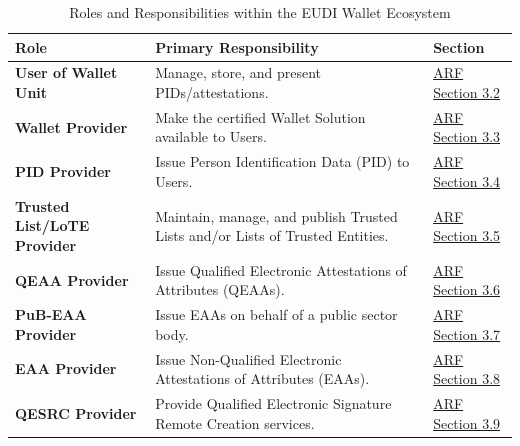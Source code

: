 \documentclass{article}
\begin{document}
\begin{table}[htbp]
    \centering
    \caption{Roles and Responsibilities within the EUDI Wallet Ecosystem}
    \label{tab:roles}
    \small
    \begin{tabularx}{\textwidth}{@{}l L l@{}}
        \toprule
        \textbf{Role} & \textbf{Primary Responsibility} & \textbf{Section} \\
        \midrule
        \textbf{User of Wallet Unit} & Manage, store, and present PIDs/attestations. & \href{https://eudi.dev/latest/architecture-and-reference-framework-main/\#32-users-of-wallet-units}{ARF Section 3.2} \\
        \textbf{Wallet Provider} & Make the certified Wallet Solution available to Users. & \href{https://eudi.dev/latest/architecture-and-reference-framework-main/\#33-wallet-providers}{ARF Section 3.3} \\
        \textbf{PID Provider} & Issue Person Identification Data (PID) to Users. & \href{https://eudi.dev/latest/architecture-and-reference-framework-main/\#34-person-identification-data-pid-providers}{ARF Section 3.4} \\
        \textbf{Trusted List/LoTE Provider} & Maintain, manage, and publish Trusted Lists and/or Lists of Trusted Entities. & \href{https://eudi.dev/latest/architecture-and-reference-framework-main/\#35-trusted-list-or-lote-provider}{ARF Section 3.5} \\
        \textbf{QEAA Provider} & Issue Qualified Electronic Attestations of Attributes (QEAAs). & \href{https://eudi.dev/latest/architecture-and-reference-framework-main/\#36-qualified-electronic-attestation-of-attributes-qeaa-providers}{ARF Section 3.6} \\
        \textbf{PuB-EAA Provider} & Issue EAAs on behalf of a public sector body. & \href{https://eudi.dev/latest/architecture-and-reference-framework-main/\#37-eaa-issued-by-or-on-behalf-of-a-public-sector-body-responsible-for-an-authentic-source-pub-eaa-providers}{ARF Section 3.7} \\
        \textbf{EAA Provider} & Issue Non-Qualified Electronic Attestations of Attributes (EAAs). & \href{https://eudi.dev/latest/architecture-and-reference-framework-main/\#38-non-qualified-electronic-attestation-of-attributes-eaa-providers}{ARF Section 3.8} \\
        \textbf{QESRC Provider} & Provide Qualified Electronic Signature Remote Creation services. & \href{https://eudi.dev/latest/architecture-and-reference-framework-main/\#39-qualified-electronic-signature-remote-creation-qesrc-providers}{ARF Section 3.9} \\

\end{tabularx}
\end{table}
\end{document}
